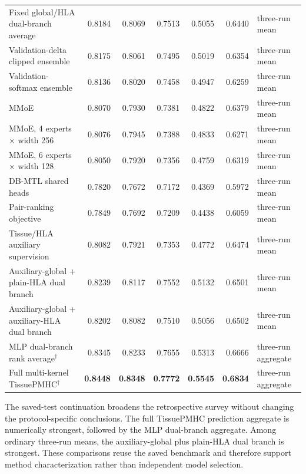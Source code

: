\begin{table}[t]
\begin{tabularx}{\textwidth}{>{\raggedright\arraybackslash}Xrrrrr
                            >{\raggedright\arraybackslash}p{1.7cm}}
Fixed global/HLA dual-branch average & 0.8184 & 0.8069 & 0.7513 & 0.5055 & 0.6440 & three-run mean \\
Validation-delta clipped ensemble & 0.8175 & 0.8061 & 0.7495 & 0.5019 & 0.6354 & three-run mean \\
Validation-softmax ensemble & 0.8136 & 0.8020 & 0.7458 & 0.4947 & 0.6259 & three-run mean \\
MMoE & 0.8070 & 0.7930 & 0.7381 & 0.4822 & 0.6379 & three-run mean \\
MMoE, 4 experts $\times$ width 256 & 0.8076 & 0.7945 & 0.7388 & 0.4833 & 0.6271 & three-run mean \\
MMoE, 6 experts $\times$ width 128 & 0.8050 & 0.7920 & 0.7356 & 0.4759 & 0.6319 & three-run mean \\
DB-MTL shared heads & 0.7820 & 0.7672 & 0.7172 & 0.4369 & 0.5972 & three-run mean \\
Pair-ranking objective & 0.7849 & 0.7692 & 0.7209 & 0.4438 & 0.6059 & three-run mean \\
Tissue/HLA auxiliary supervision & 0.8082 & 0.7921 & 0.7353 & 0.4772 & 0.6474 & three-run mean \\
Auxiliary-global + plain-HLA dual branch & 0.8239 & 0.8117 & 0.7552 & 0.5132 & 0.6501 & three-run mean \\
Auxiliary-global + auxiliary-HLA dual branch & 0.8202 & 0.8082 & 0.7510 & 0.5056 & 0.6502 & three-run mean \\
MLP dual-branch rank average$^\dagger$ & 0.8345 & 0.8233 & 0.7655 & 0.5313 & 0.6666 & three-run aggregate \\
Full multi-kernel TissuePMHC$^\dagger$ & \textbf{0.8448} & \textbf{0.8348} & \textbf{0.7772} & \textbf{0.5545} & \textbf{0.6834} & three-run aggregate \\
\bottomrule
\end{tabularx}
\end{table}

The saved-test continuation broadens the retrospective survey without changing the protocol-specific conclusions. The full TissuePMHC prediction aggregate is numerically strongest, followed by the MLP dual-branch aggregate. Among ordinary three-run means, the auxiliary-global plus plain-HLA dual branch is strongest. These comparisons reuse the saved benchmark and therefore support method characterization rather than independent model selection.

